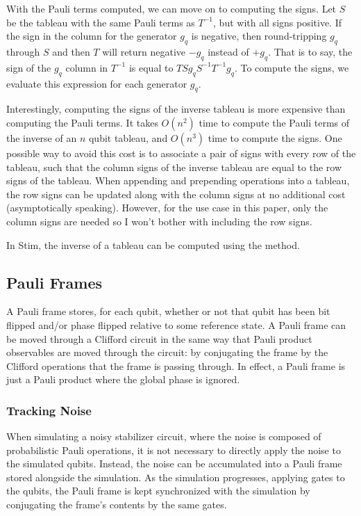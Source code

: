 \documentclass[onecolumn,unpublished]{quantumarticle}
\theoremstyle{definition}
\theoremstyle{definition}
\theoremstyle{definition}
\begin{document}
With the Pauli terms computed, we can move on to computing the signs.
Let $S$ be the tableau with the same Pauli terms as $T^{-1}$, but with all signs positive.
If the sign in the column for the generator $g_q$ is negative, then round-tripping $g_q$ through $S$ and then $T$ will return negative $-g_q$ instead of $+g_q$.
That is to say, the sign of the $g_q$ column in $T^{-1}$ is equal to $T Sg_q S^{-1} T^{-1} g_q$.
To compute the signs, we evaluate this expression for each generator $g_q$.

Interestingly, computing the signs of the inverse tableau is more expensive than computing the Pauli terms.
It takes $O(n^2)$ time to compute the Pauli terms of the inverse of an $n$ qubit tableau, and $O(n^3)$ time to compute the signs.
One possible way to avoid this cost is to associate a pair of signs with every row of the tableau, such that the column signs of the inverse tableau are equal to the row signs of the tableau.
When appending and prepending operations into a tableau, the row signs can be updated along with the column signs at no additional cost (asymptotically speaking).
However, for the use case in this paper, only the column signs are needed so I won't bother with including the row signs.

In Stim, the inverse of a tableau can be computed using the  method.

\subsection{Pauli Frames}

A Pauli frame stores, for each qubit, whether or not that qubit has been bit flipped and/or phase flipped relative to some reference state.
A Pauli frame can be moved through a Clifford circuit in the same way that Pauli product observables are moved through the circuit: by conjugating the frame by the Clifford operations that the frame is passing through.
In effect, a Pauli frame is just a Pauli product where the global phase is ignored.

\subsubsection{Tracking Noise}

When simulating a noisy stabilizer circuit, where the noise is composed of probabilistic Pauli operations, it is not necessary to directly apply the noise to the simulated qubits.
Instead, the noise can be accumulated into a Pauli frame stored alongside the simulation.
As the simulation progresses, applying gates to the qubits, the Pauli frame is kept synchronized with the simulation by conjugating the frame's contents by the same gates.
\end{document}
